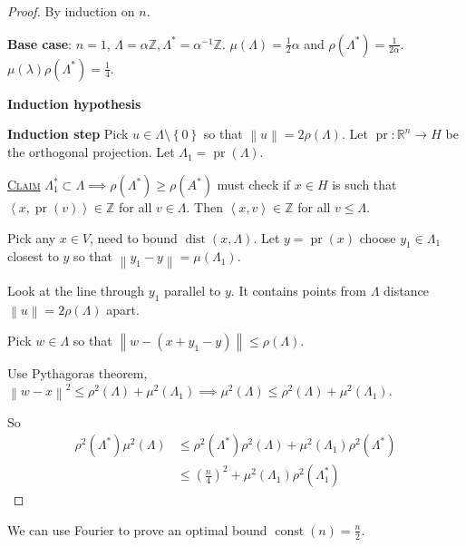 \documentclass{report}
\newcommand{\R}{\mathbb{R}}
\newcommand{\Z}{\mathbb{Z}}
\def \dist {\operatorname{dist}}
\def \dist {\operatorname{dist}}
\newcommand{\inner}[2]{\left\langle #1, #2\right\rangle}
\newcommand{\norm}[1]{\left\| #1 \right\|}
\newcommand{\set}[1]{\left\{ #1 \right\}}
\newcommand{\fancyem}[1]{\underline{\textsc{#1}}}
\theoremstyle{definition}
\theoremstyle{remark}
\numberwithin{equation}{section}
\begin{document}
\begin{proof}
    By induction on $n$.

    \textbf{Base case}: $n = 1$, $\Lambda = \alpha\Z, \Lambda^* = \alpha^{-1} \Z$.
    $\mu(\Lambda) = \frac{1}{2}\alpha$ and $\rho(\Lambda^*) = \frac{1}{2\alpha}$. $\mu(\lambda)\rho(\Lambda^*) = \frac{1}{4}$.

    \textbf{Induction hypothesis}

    \textbf{Induction step}
    Pick $u \in \Lambda \setminus \set{0}$ so that $\norm{u} = 2\rho(\Lambda)$. Let $\operatorname{pr}: \R^n \to H$ be the orthogonal projection. Let $\Lambda_1 = \operatorname{pr}(\Lambda)$.

    \fancyem{Claim} $\Lambda_1^* \subset \Lambda \implies \rho(\Lambda^*) \geq \rho(A^*)$ must check if $x \in H$ is such that $\inner{x}{\operatorname{pr}(v)} \in \Z$ for all $v \in \Lambda$. Then $\inner{x}{v} \in \Z$ for all $v \leq \Lambda$.

    Pick any $x \in V$, need to bound $\dist(x,\Lambda)$. Let $y = \operatorname{pr}(x)$ choose $y_1 \in \Lambda_1$ closest to $y$ so that $\norm{y_1 - y} = \mu(\Lambda_1)$.

    Look at the line through $y_1$ parallel to $y$. It contains points from $\Lambda$ distance $\norm{u} = 2\rho(\Lambda)$ apart.

    Pick $w \in \Lambda$ so that $\norm{w - (x + y_1 -y)} \leq \rho(\Lambda)$.

    Use Pythagoras theorem, $\norm{w - x}^2 \leq \rho^2(\Lambda) + \mu^2(\Lambda_1) \implies \mu^2(\Lambda) \leq \rho^2(\Lambda) + \mu^2(\Lambda_1)$.

    So \begin{align*}
        \rho^2(\Lambda^*)\mu^2(\Lambda) 
        & \leq \rho^2(\Lambda^*)\rho^2(\Lambda)+\mu^2(\Lambda_1)\rho^2(\Lambda^*) \\
        & \leq \left(\frac{n}{4}\right)^2 + \mu^2(\Lambda_1)\rho^2(\Lambda_1^*)
    \end{align*}
\end{proof}

We can use Fourier to prove an optimal bound $\operatorname{const}(n) = \frac{n}{2}$.
\end{document}
